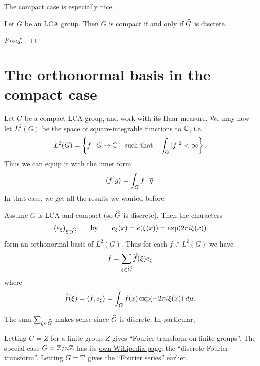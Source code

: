 The compact case is especially nice.
\begin{proposition}
	Let $G$ be an LCA group.
	Then $G$ is compact if and only if $\widehat G$ is discrete.
\end{proposition}
\begin{proof}
	.
\end{proof}

\section{The orthonormal basis in the compact case}
Let $G$ be a compact LCA group,
and work with its Haar measure.
We may now let $L^2(G)$ be the space of
square-integrable functions to $\mathbb C$, i.e.
\[ L^2(G) = \left\{ f \colon G \to \mathbb C
	\quad\text{such that}\quad \int_G |f|^2 < \infty \right\}. \]
Thus we can equip it with the inner form
\[ \left< f,g \right> = \int_G f \cdot \overline{g}. \]
In that case, we get all the results we wanted before:
\begin{theorem}
	\label{thm:god}
	Assume $G$ is LCA and compact (so $\widehat G$ is discrete).
	Then the characters
	\[ (e_\xi)_{\xi \in \widehat G}
		\qquad\text{by}\qquad e_\xi(x) = e(\xi(x)) = \exp(2\pi i \xi(x)) \]
	form an orthonormal basis of $L^2(G)$.
	Thus for each $f \in L^2(G)$ we have
	\[ f = \sum_{\xi \in \widehat G} \widehat f(\xi) e_\xi \]
	where
	\[ \widehat f(\xi) = \left< f, e_\xi \right>
		= \int_G f(x) \exp(-2\pi i \xi(x)) \; d\mu. \]
\end{theorem}
The sum $\sum_{\xi \in \widehat G}$ makes sense since $\widehat G$ is discrete.
In particular,
\begin{itemize}
	\ii Letting $G = Z$ for a finite group $Z$
	gives ``Fourier transform on finite groups''.
	\ii The special case $G = \mathbb Z/n\mathbb Z$ has its
	\href{https://en.wikipedia.org/wiki/Discrete_Fourier_transform#Definition}%
	{own Wikipedia page}: the ``discrete Fourier transform''.
	\ii Letting $G = \mathbb T$ gives the ``Fourier series'' earlier.
\end{itemize}

